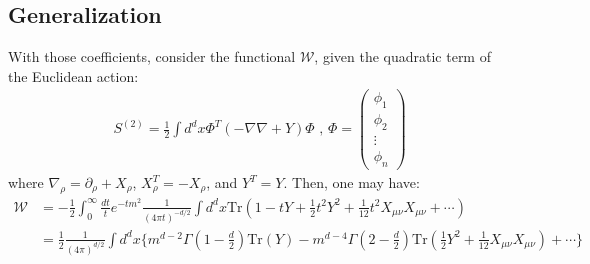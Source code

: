 \documentclass[fleqn]{article}
\begin{document}
\subsection{Generalization}
With those coefficients, consider the functional $\mathcal{W}$, given the quadratic term of the Euclidean action:
\begin{align}
S^{(2)} = \frac{1}{2} \int d^{d}x \Phi^{T} (-\nabla \nabla + Y) \Phi \text{   ,   } \Phi  = \begin{pmatrix}
\phi_{1} \\
\phi_{2} \\
\vdots \\
\phi_{n} 
\end{pmatrix}
\end{align}
where $\nabla_{\rho} = \partial _{\rho} + X_{\rho}$, $X_{\rho}^{T} = -X_{\rho}$, and $Y^{T} = Y$.
Then, one may have:
\begin{align}
\mathcal{W} & = -\frac{1}{2} \int _{0}^{\infty} \frac{dt}{t} e^{-tm^{2}}\frac{1}{(4\pi t)^{-d/2}} \int d^{d}x \text{Tr} (1 - tY + \frac{1}{2} t^{2} Y^{2} + \frac{1}{12} t^{2} X_{\mu \nu} X_{\mu \nu} + \cdots ) \nonumber \\
&= \frac{1} {2} \frac{1}{(4\pi)^{d/2}}\int d^{d}x \lbrace m^{d-2} \Gamma(1-\frac{d}{2}) \text{Tr} (Y) - m^{d-4} \Gamma(2-\frac{d}{2}) \text{Tr}(\frac{1}{2}Y^{2} + \frac{1}{12} X_{\mu \nu} X_{\mu \nu}) + \cdots   \rbrace 
\end{align}
\end{document}
